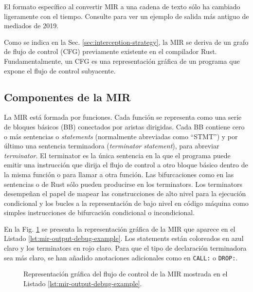 El formato específico al convertir \acrshort{MIR} a una cadena de texto sólo ha cambiado ligeramente con el
tiempo. Consulte \cite[Section 3.3]{meyer2020} para ver un ejemplo de salida más antiguo de
mediados de 2019.

Como se indica en la Sec. \ref{sec:interception-strategy}, la \acrshort{MIR} se deriva
de un grafo de flujo de control (\acrfull{CFG}) previamente existente en el compilador Rust.
Fundamentalmente, un \acrshort{CFG} es una
representación gráfica de un programa que expone el flujo de control subyacente.

\subsection{Componentes de la MIR}
\label{sec:mir-components}

La \acrshort{MIR} está formada por funciones.
Cada función se representa como una serie de bloques
básicos (\acrfull{BB}) conectados por aristas dirigidas.
Cada \acrshort{BB} contiene cero o más sentencias o \emph{statements}
(normalmente abreviadas como ``STMT'') y por último una sentencia terminadora (\emph{terminator statement}), para
abreviar \emph{terminator}.
El terminator es la única sentencia en la que el programa puede emitir una
instrucción que dirija el flujo de control a otro bloque básico dentro de la misma función o para
llamar a otra función.
Las bifurcaciones como en las sentencias  o  de Rust sólo pueden
producirse en los terminators. Los terminators desempeñan el papel de mapear las
construcciones de alto nivel para la ejecución condicional y los bucles a la representación de
bajo nivel en código máquina como simples instrucciones  de bifurcación condicional o
incondicional.

En la Fig. \ref{fig:mir-cfg-example} se presenta
la representación gráfica de la \acrshort{MIR} que aparece en el
Listado \ref{lst:mir-output-debug-example}.
Los statements están coloreados en azul claro y los terminators en rojo claro.
Para que el tipo de declaración terminadora sea más claro,
se han añadido anotaciones adicionales como en \texttt{CALL:} o \texttt{DROP:}.

\begin{figure}[!htb]
    \centering
    
    \caption{Representación gráfica del flujo de control de la MIR mostrada en el Listado \ref{lst:mir-output-debug-example}.}
    \label{fig:mir-cfg-example}
\end{figure}


